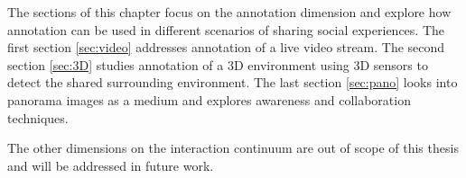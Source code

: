The sections of this chapter focus on the annotation dimension and explore how annotation can be used in different scenarios of sharing social experiences. The first section \ref{sec:video} addresses annotation of a live video stream. The second section \ref{sec:3D} studies annotation of a 3D environment using 3D sensors to detect the shared surrounding environment. The last section \ref{sec:pano} looks into panorama images as a medium and explores awareness and collaboration techniques. 

The other dimensions on the interaction continuum are out of scope of this thesis and will be addressed in future work. 





